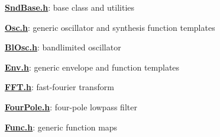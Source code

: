 {\bfseries \hyperlink{_snd_base_8h}{Snd\+Base.\+h}}\+: base class and utilities

{\bfseries \hyperlink{_osc_8h}{Osc.\+h}}\+: generic oscillator and synthesis function templates

{\bfseries \hyperlink{_bl_osc_8h}{Bl\+Osc.\+h}}\+: bandlimited oscillator

{\bfseries \hyperlink{_env_8h}{Env.\+h}}\+: generic envelope and function templates

{\bfseries \hyperlink{_f_f_t_8h}{F\+F\+T.\+h}}\+: fast-\/fourier transform

{\bfseries \hyperlink{_four_pole_8h}{Four\+Pole.\+h}}\+: four-\/pole lowpass filter

{\bfseries \hyperlink{_func_8h}{Func.\+h}}\+: generic function maps 